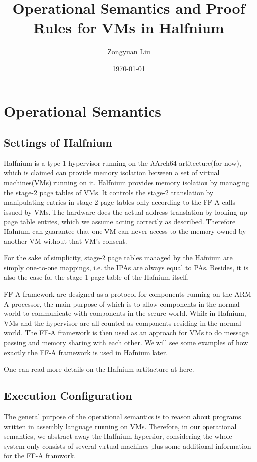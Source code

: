 \documentclass[a4paper]{article}
\title{Operational Semantics and Proof Rules for VMs in Halfnium}
\date{\today}
\author{Zongyuan Liu}
\begin{document}
\maketitle

\section{Operational Semantics}

\subsection{Settings of Halfnium}
Halfnium is a type-1 hypervisor running on the AArch64 artitecture(for now), which is claimed can provide memory isolation between a set of virtual machines(VMs) running on it.
Halfnium provides memory isolation by managing the stage-2 page tables of VMs. It controls the stage-2 translation by manipulating entries in stage-2 page tables only according to the FF-A calls issued by VMs. The hardware does the actual address translation by looking up page table entries, which we assume acting correctly as described. Therefore Halnium can guarantee that one VM can never access to the memory owned by another VM without that VM's consent.

For the sake of simplicity, stage-2 page tables managed by the Hafnium are simply one-to-one mappings, i.e. the IPAs are always equal to PAs. Besides, it is also the case for the stage-1 page table of the Hafnium itself.

FF-A framework are designed as a protocol for components running on the ARM-A processor, the main purpose of which is to allow components in the normal world to communicate with components in the secure world. While in Hafnium, VMs and the hypervisor are all counted as components residing in the normal world. The FF-A framework is then used as an approach for VMs to do message passing and memory sharing with each other. We will see some examples of how exactly the FF-A framework is used in Hafnium later.

One can read more details on the Hafnium artitacture at here.

\subsection{Execution Configuration}
The general purpose of the operational semantics is to reason about programs written in assembly language running on VMs. Therefore, in our operational semantics, we abstract away the Halfnium hypersior, considering the whole system only consists of several virtual machines plus some additional information for the FF-A framwork.
\end{document}
